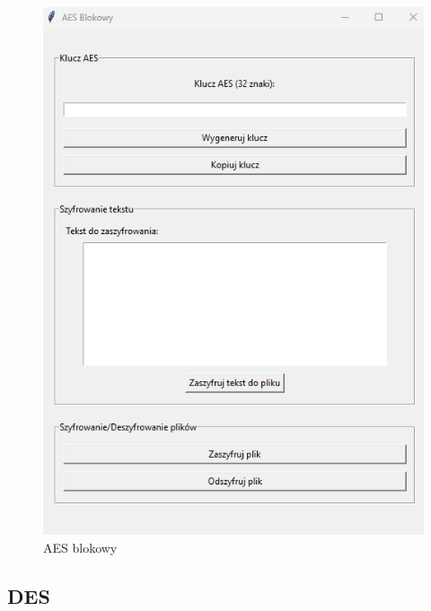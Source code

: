 \documentclass[12pt,a4paper]{article}
\begin{document}
\begin{figure}[!htb]
\begin{center}
\includegraphics[scale=0.45]{pictures/aesblokowy.png}
\caption{AES blokowy}
\label{fig:AES blokowy}
\end{center}
\end{figure}

\newpage
\subsection{DES}
\end{document}
